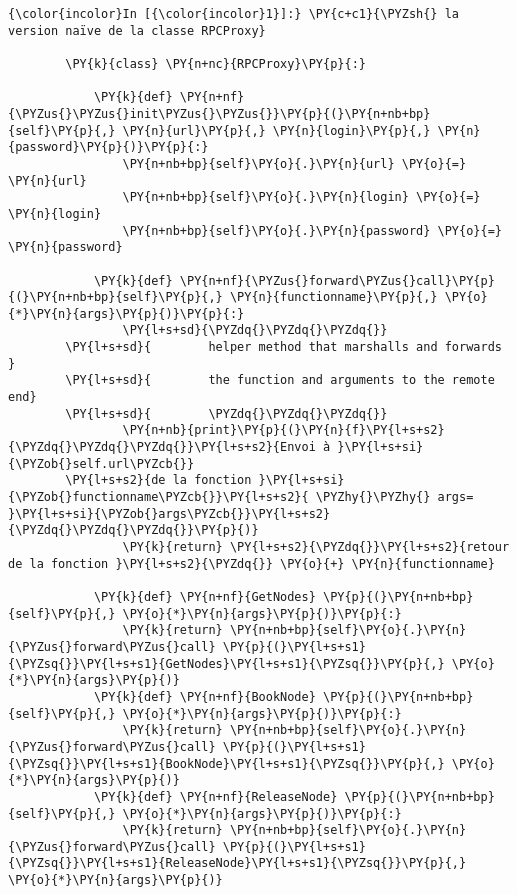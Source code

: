     \begin{Verbatim}[commandchars=\\\{\},frame=single,framerule=0.3mm,rulecolor=\color{cellframecolor}]
{\color{incolor}In [{\color{incolor}1}]:} \PY{c+c1}{\PYZsh{} la version naïve de la classe RPCProxy}
        
        \PY{k}{class} \PY{n+nc}{RPCProxy}\PY{p}{:}
            
            \PY{k}{def} \PY{n+nf}{\PYZus{}\PYZus{}init\PYZus{}\PYZus{}}\PY{p}{(}\PY{n+nb+bp}{self}\PY{p}{,} \PY{n}{url}\PY{p}{,} \PY{n}{login}\PY{p}{,} \PY{n}{password}\PY{p}{)}\PY{p}{:}
                \PY{n+nb+bp}{self}\PY{o}{.}\PY{n}{url} \PY{o}{=} \PY{n}{url}
                \PY{n+nb+bp}{self}\PY{o}{.}\PY{n}{login} \PY{o}{=} \PY{n}{login}
                \PY{n+nb+bp}{self}\PY{o}{.}\PY{n}{password} \PY{o}{=} \PY{n}{password}
                
            \PY{k}{def} \PY{n+nf}{\PYZus{}forward\PYZus{}call}\PY{p}{(}\PY{n+nb+bp}{self}\PY{p}{,} \PY{n}{functionname}\PY{p}{,} \PY{o}{*}\PY{n}{args}\PY{p}{)}\PY{p}{:}
                \PY{l+s+sd}{\PYZdq{}\PYZdq{}\PYZdq{}}
        \PY{l+s+sd}{        helper method that marshalls and forwards }
        \PY{l+s+sd}{        the function and arguments to the remote end}
        \PY{l+s+sd}{        \PYZdq{}\PYZdq{}\PYZdq{}}
                \PY{n+nb}{print}\PY{p}{(}\PY{n}{f}\PY{l+s+s2}{\PYZdq{}\PYZdq{}\PYZdq{}}\PY{l+s+s2}{Envoi à }\PY{l+s+si}{\PYZob{}self.url\PYZcb{}}
        \PY{l+s+s2}{de la fonction }\PY{l+s+si}{\PYZob{}functionname\PYZcb{}}\PY{l+s+s2}{ \PYZhy{}\PYZhy{} args= }\PY{l+s+si}{\PYZob{}args\PYZcb{}}\PY{l+s+s2}{\PYZdq{}\PYZdq{}\PYZdq{}}\PY{p}{)}
                \PY{k}{return} \PY{l+s+s2}{\PYZdq{}}\PY{l+s+s2}{retour de la fonction }\PY{l+s+s2}{\PYZdq{}} \PY{o}{+} \PY{n}{functionname}
            
            \PY{k}{def} \PY{n+nf}{GetNodes} \PY{p}{(}\PY{n+nb+bp}{self}\PY{p}{,} \PY{o}{*}\PY{n}{args}\PY{p}{)}\PY{p}{:}
                \PY{k}{return} \PY{n+nb+bp}{self}\PY{o}{.}\PY{n}{\PYZus{}forward\PYZus{}call} \PY{p}{(}\PY{l+s+s1}{\PYZsq{}}\PY{l+s+s1}{GetNodes}\PY{l+s+s1}{\PYZsq{}}\PY{p}{,} \PY{o}{*}\PY{n}{args}\PY{p}{)}
            \PY{k}{def} \PY{n+nf}{BookNode} \PY{p}{(}\PY{n+nb+bp}{self}\PY{p}{,} \PY{o}{*}\PY{n}{args}\PY{p}{)}\PY{p}{:}
                \PY{k}{return} \PY{n+nb+bp}{self}\PY{o}{.}\PY{n}{\PYZus{}forward\PYZus{}call} \PY{p}{(}\PY{l+s+s1}{\PYZsq{}}\PY{l+s+s1}{BookNode}\PY{l+s+s1}{\PYZsq{}}\PY{p}{,} \PY{o}{*}\PY{n}{args}\PY{p}{)}
            \PY{k}{def} \PY{n+nf}{ReleaseNode} \PY{p}{(}\PY{n+nb+bp}{self}\PY{p}{,} \PY{o}{*}\PY{n}{args}\PY{p}{)}\PY{p}{:}
                \PY{k}{return} \PY{n+nb+bp}{self}\PY{o}{.}\PY{n}{\PYZus{}forward\PYZus{}call} \PY{p}{(}\PY{l+s+s1}{\PYZsq{}}\PY{l+s+s1}{ReleaseNode}\PY{l+s+s1}{\PYZsq{}}\PY{p}{,} \PY{o}{*}\PY{n}{args}\PY{p}{)}
\end{Verbatim}


